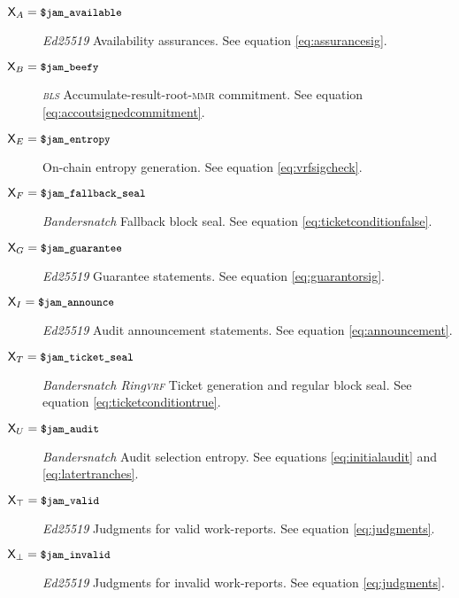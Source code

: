 \begin{description}
  \item[$\mathsf{X}_A = \text{{\small \texttt{\$jam\_available}}}$] \emph{Ed25519} Availability assurances. See equation \ref{eq:assurancesig}.
  \item[$\mathsf{X}_B = \text{{\small \texttt{\$jam\_beefy}}}$] \emph{\textsc{bls}} Accumulate-result-root-\textsc{mmr} commitment. See equation \ref{eq:accoutsignedcommitment}.
  \item[$\mathsf{X}_E = \text{{\small \texttt{\$jam\_entropy}}}$] On-chain entropy generation. See equation \ref{eq:vrfsigcheck}.
  \item[$\mathsf{X}_F = \text{{\small \texttt{\$jam\_fallback\_seal}}}$] \emph{Bandersnatch} Fallback block seal. See equation \ref{eq:ticketconditionfalse}.
  \item[$\mathsf{X}_G = \text{{\small \texttt{\$jam\_guarantee}}}$] \emph{Ed25519} Guarantee statements. See equation \ref{eq:guarantorsig}.
  \item[$\mathsf{X}_I = \text{{\small \texttt{\$jam\_announce}}}$] \emph{Ed25519} Audit announcement statements. See equation \ref{eq:announcement}.
  \item[$\mathsf{X}_T = \text{{\small \texttt{\$jam\_ticket\_seal}}}$] \emph{Bandersnatch Ring\textsc{vrf}} Ticket generation and regular block seal. See equation \ref{eq:ticketconditiontrue}.
  \item[$\mathsf{X}_U = \text{{\small \texttt{\$jam\_audit}}}$] \emph{Bandersnatch} Audit selection entropy. See equations \ref{eq:initialaudit} and \ref{eq:latertranches}.
  \item[$\mathsf{X}_\top = \text{{\small \texttt{\$jam\_valid}}}$] \emph{Ed25519} Judgments for valid work-reports. See equation \ref{eq:judgments}.
  \item[$\mathsf{X}_\bot = \text{{\small \texttt{\$jam\_invalid}}}$] \emph{Ed25519} Judgments for invalid work-reports. See equation \ref{eq:judgments}.
\end{description}
